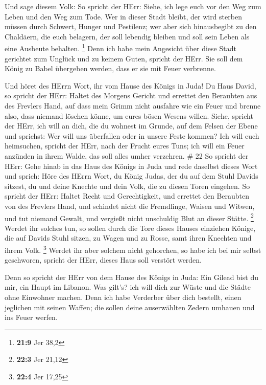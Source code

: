  Und sage diesem Volk: So spricht der HErr: Siehe, ich lege
euch vor den Weg zum Leben und den Weg zum Tode.  Wer in
dieser Stadt bleibt, der wird sterben müssen durch Schwert, Hunger und
Pestilenz; wer aber sich hinausbegibt zu den Chaldäern, die euch
belagern, der soll lebendig bleiben und soll sein Leben als eine
Ausbeute behalten. \footnote{\textbf{21:9} Jer 38,2}  Denn
ich habe mein Angesicht über diese Stadt gerichtet zum Unglück und zu
keinem Guten, spricht der HErr. Sie soll dem König zu Babel übergeben
werden, dass er sie mit Feuer verbrenne.

 Und höret des HErrn Wort, ihr vom Hause des Königs in
Juda!  Du Haus David, so spricht der HErr: Haltet des
Morgens Gericht und errettet den Beraubten aus des Frevlers Hand, auf
dass mein Grimm nicht ausfahre wie ein Feuer und brenne also, dass
niemand löschen könne, um eures bösen Wesens willen. 
Siehe, spricht der HErr, ich will an dich, die du wohnest im Grunde, auf
dem Felsen der Ebene und sprichst: Wer will uns überfallen oder in
unsere Feste kommen?  Ich will euch heimsuchen, spricht der
HErr, nach der Frucht eures Tuns; ich will ein Feuer anzünden in ihrem
Walde, das soll alles umher verzehren. \# 22  So spricht der
HErr: Gehe hinab in das Haus des Königs in Juda und rede daselbst dieses
Wort  und sprich: Höre des HErrn Wort, du König Judas, der
du auf dem Stuhl Davids sitzest, du und deine Knechte und dein Volk, die
zu diesen Toren eingehen.  So spricht der HErr: Haltet Recht
und Gerechtigkeit, und errettet den Beraubten von des Frevlers Hand, und
schindet nicht die Fremdlinge, Waisen und Witwen, und tut niemand
Gewalt, und vergießt nicht unschuldig Blut an dieser Stätte. \footnote{\textbf{22:3}
  Jer 21,12}  Werdet ihr solches tun, so sollen durch die
Tore dieses Hauses einziehen Könige, die auf Davids Stuhl sitzen, zu
Wagen und zu Rosse, samt ihren Knechten und ihrem Volk. \footnote{\textbf{22:4}
  Jer 17,25}  Werdet ihr aber solchem nicht gehorchen, so
habe ich bei mir selbst geschworen, spricht der HErr, dieses Haus soll
verstört werden.

 Denn so spricht der HErr von dem Hause des Königs in Juda:
Ein Gilead bist du mir, ein Haupt im Libanon. Was gilt's? ich will dich
zur Wüste und die Städte ohne Einwohner machen.  Denn ich
habe Verderber über dich bestellt, einen jeglichen mit seinen Waffen;
die sollen deine auserwählten Zedern umhauen und ins Feuer werfen.

